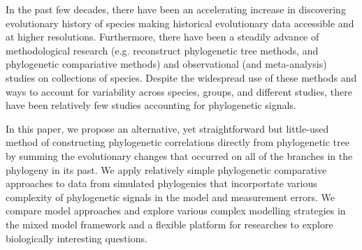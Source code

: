In the past few decades, there have been an accelerating increase in discovering evolutionary history of species making historical evolutionary data accessible and at higher resolutions.
Furthermore, there have been a steadily advance of methodological research (e.g. reconstruct phylogenetic tree methods, and phylogenetic compariative methods) and observational (and meta-analysis) studies on collections of species. 
Despite the widespread use of these methods and ways to account for variability across species, groups, and different studies, there have been relatively few studies accounting for phylogenetic signals. 





In this paper, we propose an alternative, yet straightforward but little-used method of constructing phylogenetic correlations directly from phylogenetic tree by summing the evolutionary changes that occurred on all of the branches in the phylogeny in its past.
We apply relatively simple phylogenetic comparative approaches to data from simulated phylogenies that incorportate various complexity of phylogenetic signals in the model and measurement errors. 
We compare model approaches and explore various complex modelling strategies in the mixed model framework and a flexible platform for researches to explore biologically interesting questions.

